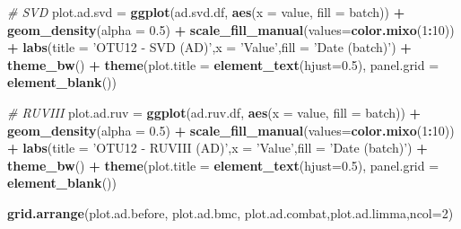 \documentclass[]{book}
\newenvironment{Shaded}{\begin{snugshade}}{\end{snugshade}}
\newcommand{\KeywordTok}[1]{\textcolor[rgb]{0.13,0.29,0.53}{\textbf{#1}}}
\newcommand{\DataTypeTok}[1]{\textcolor[rgb]{0.13,0.29,0.53}{#1}}
\newcommand{\DecValTok}[1]{\textcolor[rgb]{0.00,0.00,0.81}{#1}}
\newcommand{\FloatTok}[1]{\textcolor[rgb]{0.00,0.00,0.81}{#1}}
\newcommand{\StringTok}[1]{\textcolor[rgb]{0.31,0.60,0.02}{#1}}
\newcommand{\CommentTok}[1]{\textcolor[rgb]{0.56,0.35,0.01}{\textit{#1}}}
\newcommand{\OperatorTok}[1]{\textcolor[rgb]{0.81,0.36,0.00}{\textbf{#1}}}
\newcommand{\NormalTok}[1]{#1}
\begin{document}
\begin{Shaded}
\begin{Highlighting}[]
\CommentTok{# SVD}
\NormalTok{plot.ad.svd =}\StringTok{ }\KeywordTok{ggplot}\NormalTok{(ad.svd.df, }\KeywordTok{aes}\NormalTok{(}\DataTypeTok{x =}\NormalTok{ value, }\DataTypeTok{fill =}\NormalTok{ batch)) }\OperatorTok{+}\StringTok{ }\KeywordTok{geom_density}\NormalTok{(}\DataTypeTok{alpha =} \FloatTok{0.5}\NormalTok{) }\OperatorTok{+}\StringTok{ }\KeywordTok{scale_fill_manual}\NormalTok{(}\DataTypeTok{values=}\KeywordTok{color.mixo}\NormalTok{(}\DecValTok{1}\OperatorTok{:}\DecValTok{10}\NormalTok{)) }\OperatorTok{+}\StringTok{ }\KeywordTok{labs}\NormalTok{(}\DataTypeTok{title =} \StringTok{'OTU12 - SVD (AD)'}\NormalTok{,}\DataTypeTok{x =} \StringTok{'Value'}\NormalTok{,}\DataTypeTok{fill =} \StringTok{'Date (batch)'}\NormalTok{) }\OperatorTok{+}\StringTok{ }\KeywordTok{theme_bw}\NormalTok{() }\OperatorTok{+}\StringTok{ }\KeywordTok{theme}\NormalTok{(}\DataTypeTok{plot.title =} \KeywordTok{element_text}\NormalTok{(}\DataTypeTok{hjust=}\FloatTok{0.5}\NormalTok{), }\DataTypeTok{panel.grid =} \KeywordTok{element_blank}\NormalTok{())}


\CommentTok{# RUVIII}
\NormalTok{plot.ad.ruv =}\StringTok{ }\KeywordTok{ggplot}\NormalTok{(ad.ruv.df, }\KeywordTok{aes}\NormalTok{(}\DataTypeTok{x =}\NormalTok{ value, }\DataTypeTok{fill =}\NormalTok{ batch)) }\OperatorTok{+}\StringTok{ }\KeywordTok{geom_density}\NormalTok{(}\DataTypeTok{alpha =} \FloatTok{0.5}\NormalTok{) }\OperatorTok{+}\StringTok{ }\KeywordTok{scale_fill_manual}\NormalTok{(}\DataTypeTok{values=}\KeywordTok{color.mixo}\NormalTok{(}\DecValTok{1}\OperatorTok{:}\DecValTok{10}\NormalTok{)) }\OperatorTok{+}\StringTok{ }\KeywordTok{labs}\NormalTok{(}\DataTypeTok{title =} \StringTok{'OTU12 - RUVIII (AD)'}\NormalTok{,}\DataTypeTok{x =} \StringTok{'Value'}\NormalTok{,}\DataTypeTok{fill =} \StringTok{'Date (batch)'}\NormalTok{) }\OperatorTok{+}\StringTok{ }\KeywordTok{theme_bw}\NormalTok{() }\OperatorTok{+}\StringTok{ }\KeywordTok{theme}\NormalTok{(}\DataTypeTok{plot.title =} \KeywordTok{element_text}\NormalTok{(}\DataTypeTok{hjust=}\FloatTok{0.5}\NormalTok{), }\DataTypeTok{panel.grid =} \KeywordTok{element_blank}\NormalTok{())}
\end{Highlighting}
\end{Shaded}

\begin{Shaded}
\begin{Highlighting}[]
\KeywordTok{grid.arrange}\NormalTok{(plot.ad.before, plot.ad.bmc, plot.ad.combat,plot.ad.limma,}\DataTypeTok{ncol=}\DecValTok{2}\NormalTok{)}
\end{Highlighting}
\end{Shaded}
\end{document}
